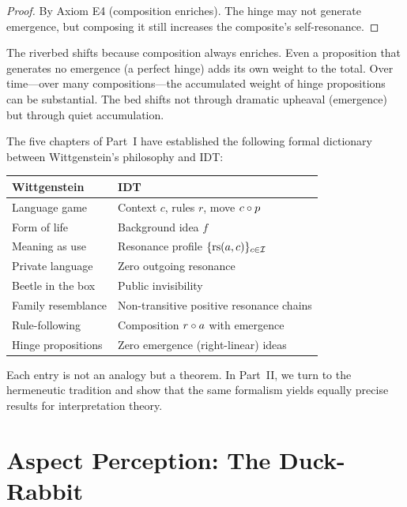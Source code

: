 \begin{proof}
By Axiom E4 (composition enriches). The hinge may not generate emergence,
but composing it still increases the composite's self-resonance.
\end{proof}

\begin{interpretation}
The riverbed shifts because composition always enriches. Even a proposition
that generates no emergence (a perfect hinge) adds its own weight to the
total. Over time---over many compositions---the accumulated weight of hinge
propositions can be substantial. The bed shifts not through dramatic upheaval
(emergence) but through quiet accumulation.
\end{interpretation}

\begin{remark}
The five chapters of Part~I have established the following formal dictionary
between Wittgenstein's philosophy and IDT:
\begin{center}
\begin{tabular}{ll}
\textbf{Wittgenstein} & \textbf{IDT} \\
\hline
Language game & Context $c$, rules $r$, move $c \circ p$ \\
Form of life & Background idea $f$ \\
Meaning as use & Resonance profile $\{\mathrm{rs}(a,c)\}_{c \in \mathcal{I}}$ \\
Private language & Zero outgoing resonance \\
Beetle in the box & Public invisibility \\
Family resemblance & Non-transitive positive resonance chains \\
Rule-following & Composition $r \circ a$ with emergence \\
Hinge propositions & Zero emergence (right-linear) ideas \\
\end{tabular}
\end{center}
Each entry is not an analogy but a theorem. In Part~II, we turn to the
hermeneutic tradition and show that the same formalism yields equally
precise results for interpretation theory.
\end{remark}



\section{Aspect Perception: The Duck-Rabbit}

